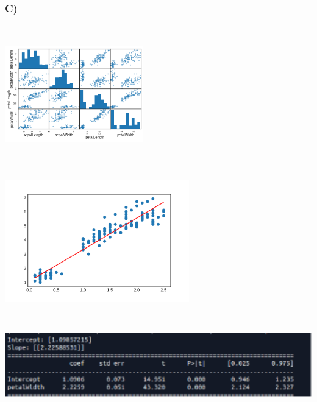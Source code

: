 \documentclass[12pt]{article}
\begin{document}
\subsubsection{C)}
\includegraphics[width=6cm, height=6cm]{ScatterPlot}
\includegraphics[width=8cm, height=6.5cm]{LR}\\\\
\includegraphics[width=15cm, height=3cm]{ss6}
\end{document}
